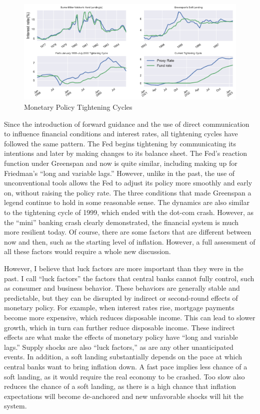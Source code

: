 \documentclass[
  letterpaper,
  DIV=11,
  numbers=noendperiod]{scrartcl}
\begin{document}
\begin{figure}

{\centering \includegraphics{Hawkish_Fed_files/figure-pdf/fig-5-output-1.pdf}

}

\caption{\label{fig-5}Monetary Policy Tightening Cycles}

\end{figure}

Since the introduction of forward guidance and the use of direct
communication to influence financial conditions and interest rates, all
tightening cycles have followed the same pattern. The Fed begins
tightening by communicating its intentions and later by making changes
to its balance sheet. The Fed's reaction function under Greenspan and
now is quite similar, including making up for Friedman's ``long and
variable lags.'' However, unlike in the past, the use of unconventional
tools allows the Fed to adjust its policy more smoothly and early on,
without raising the policy rate. The three conditions that made
Greenspan a legend continue to hold in some reasonable sense. The
dynamics are also similar to the tightening cycle of 1999, which ended
with the dot-com crash. However, as the ``mini'' banking crash clearly
demonstrated, the financial system is much more resilient today. Of
course, there are some factors that are different between now and then,
such as the starting level of inflation. However, a full assessment of
all these factors would require a whole new discussion.

However, I believe that luck factors are more important than they were
in the past. I call ``luck factors'' the factors that central banks
cannot fully control, such as consumer and business behavior. These
behaviors are generally stable and predictable, but they can be
disrupted by indirect or second-round effects of monetary policy. For
example, when interest rates rise, mortgage payments become more
expensive, which reduces disposable income. This can lead to slower
growth, which in turn can further reduce disposable income. These
indirect effects are what make the effects of monetary policy have
``long and variable lags.'' Supply shocks are also ``luck factors,'' as
are any other unanticipated events. In addition, a soft landing
substantially depends on the pace at which central banks want to bring
inflation down. A fast pace implies less chance of a soft landing, as it
would require the real economy to be crashed. Too slow also reduces the
chance of a soft landing, as there is a high chance that inflation
expectations will become de-anchored and new unfavorable shocks will hit
the system.
\end{document}

